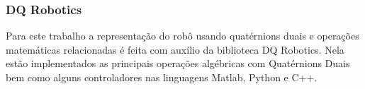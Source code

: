 \subsubsection{DQ Robotics}

Para este trabalho a representação do robô usando quatérnions duais e operações matemáticas relacionadas é feita com auxílio da biblioteca DQ Robotics. Nela estão implementados as principais operações algébricas com Quatérnions Duais bem como alguns controladores nas linguagens Matlab, Python e C++.








